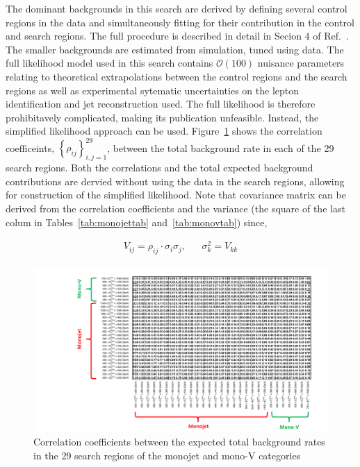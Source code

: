 The dominant backgrounds in this search are derived by defining several control regions in the data and simultaneously fitting for their contribution 
in the control and search regions. The full procedure is described in detail in Secion 4 of Ref.~\cite{CMS-PAS-EXO-16-037}. The smaller backgrounds are estimated from 
simulation, tuned using data. The full likelihood model used in this search contains $\mathcal{O}(100)$ nuisance parameters relating to theoretical 
extrapolations between the control regions and the search regions as well as experimental sytematic uncertainties on 
the lepton identification and jet reconstruction used. The full likelihood is therefore prohibitavely complicated, making its publication unfeasible. 
Instead, the simplified likelihood approach can be used. Figure~\ref{fig:fullcovariance} shows the correlation coefficeints, $\left\{\rho_{ij}\right\}_{i,j=1}^{29}$, between the total background 
rate in each of the 29 search regions. Both the correlations and the total expected background contributions are dervied without using the data in the 
search regions, allowing for construction of the simplified likelihood. Note that covariance matrix can be derived from the correlation coefficients and 
the variance (the square of the last colum in Tables~\ref{tab:monojettab} and~\ref{tab:monovtab}) since, 

\begin{align}
V_{ij} = \rho_{ij}\cdot\sigma_{i}\sigma_{j}, &&  \sigma_{k}^{2}=V_{kk}
\end{align}


\begin{figure}[hbt!]
  \begin{center} 
   \includegraphics[width=2.6\cmsFigWidth]{figures/big_corr.pdf}
\caption{Correlation coefficients between the expected total background rates in the 29 search regions of the monojet and mono-V categories}
   \label{fig:fullcovariance} 
  \end{center}
\end{figure}

